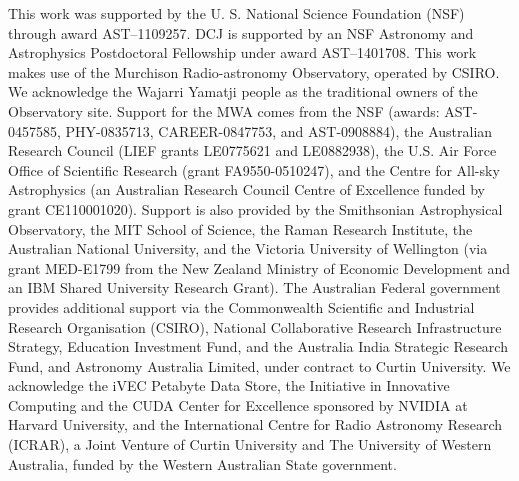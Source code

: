 \documentclass[preprint2,iop,numberedappendix]{emulateapj}
\begin{document}
This work was supported by the U. S. National Science Foundation (NSF) through award AST--1109257. DCJ is supported by an NSF Astronomy and Astrophysics Postdoctoral Fellowship under award AST--1401708.  This work makes use of the Murchison Radio-astronomy Observatory, operated by CSIRO. We acknowledge the Wajarri Yamatji people as the traditional owners of the Observatory site. Support for the MWA comes from the NSF (awards: AST-0457585, PHY-0835713, CAREER-0847753, and AST-0908884), the Australian Research Council (LIEF grants LE0775621 and LE0882938), the U.S. Air Force Office of Scientific Research (grant FA9550-0510247), and the Centre for All-sky Astrophysics (an Australian Research Council Centre of Excellence funded by grant CE110001020). Support is also provided by the Smithsonian Astrophysical Observatory, the MIT School of Science, the Raman Research Institute, the Australian National University, and the Victoria University of Wellington (via grant MED-E1799 from the New Zealand Ministry of Economic Development and an IBM Shared University Research Grant). The Australian Federal government provides additional support via the Commonwealth Scientific and Industrial Research Organisation (CSIRO), National Collaborative Research Infrastructure Strategy, Education Investment Fund, and the Australia India Strategic Research Fund, and Astronomy Australia Limited, under contract to Curtin University. We acknowledge the iVEC Petabyte Data Store, the Initiative in Innovative Computing and the CUDA Center for Excellence sponsored by NVIDIA at Harvard University, and the International Centre for Radio Astronomy Research (ICRAR), a Joint Venture of Curtin University and The University of Western Australia, funded by the Western Australian State government.  

\par\bigskip


\end{document}
